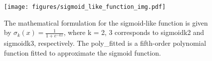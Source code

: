 \begin{figure}[htbp]
\texttt{[image: figures/sigmoid\_like\_function\_img.pdf]}
\caption{The mathematical formulation for the sigmoid-like function is given by $\sigma_k (x) = \frac{1}{1+e^{-kx}}$, where k = 2, 3 corresponds to sigmoidk2 and sigmoidk3, respectively. The poly\_fitted is a fifth-order polynomial function fitted to approximate the sigmoid function.}
\label{fig:sigmoid-like_function}
\end{figure}